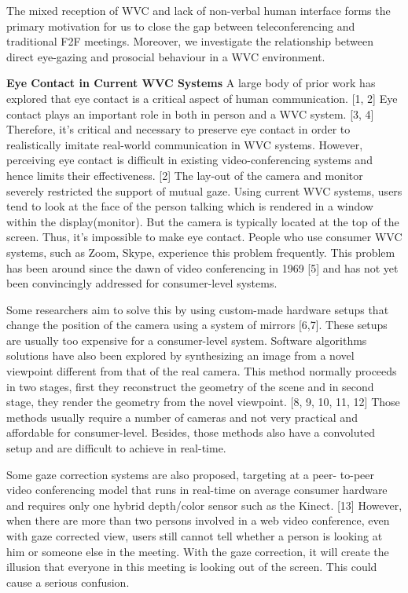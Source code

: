 \documentclass[sigconf,authordraft]{acmart}
\begin{document}
The mixed reception of WVC and lack of non-verbal human interface forms the primary motivation for us to close the gap between teleconferencing and traditional F2F meetings. Moreover, we investigate the relationship between direct eye-gazing and prosocial behaviour in a WVC environment.
\newline

\textbf{Eye Contact in Current WVC Systems}
\newline
A large body of prior work has explored that eye contact is a critical aspect of human communication. [1, 2] Eye contact plays an important role in both in person and a WVC system. [3, 4] Therefore, it’s critical and necessary to preserve eye contact in order to realistically imitate real-world communication in WVC systems. However, perceiving eye contact is difficult in existing video-conferencing systems and hence limits their effectiveness. [2] The lay-out of the camera and monitor severely restricted the support of mutual gaze. Using current WVC systems, users tend to look at the face of the person talking which is rendered in a window within the display(monitor). But the camera is typically located at the top of the screen. Thus, it’s impossible to make eye contact. People who use consumer WVC systems, such as Zoom, Skype, experience this problem frequently. This problem has been around since the dawn of video conferencing in 1969 [5] and has not yet been convincingly addressed for consumer-level systems. 

Some researchers aim to solve this by using custom-made hardware setups that change the position of the camera using a system of mirrors [6,7]. These setups are usually too expensive for a consumer-level system. Software algorithms solutions have also been explored by synthesizing an image from a novel viewpoint different from that of the real camera. This method normally proceeds in two stages, first they reconstruct the geometry of the scene and in second stage, they render the geometry from the novel viewpoint. [8, 9, 10, 11, 12] Those methods usually require a number of cameras and not very practical and affordable for consumer-level. Besides, those methods also have a convoluted setup and are difficult to achieve in real-time. 

Some gaze correction systems are also proposed, targeting at a peer- to-peer video conferencing model that runs in real-time on average consumer hardware and requires only one hybrid depth/color sensor such as the Kinect. [13] However, when there are more than two persons involved in a web video conference, even with gaze corrected view, users still cannot tell whether a person is looking at him or someone else in the meeting. With the gaze correction, it will create the illusion that everyone in this meeting is looking out of the screen. This could cause a serious confusion. 
\end{document}

